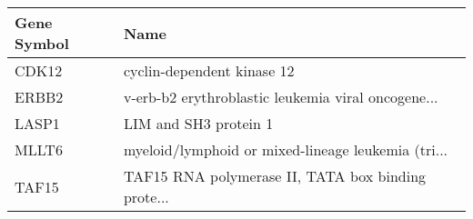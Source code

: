 \begin{tabular}{ll}
\toprule
Gene Symbol &                                               Name \\
\midrule
      CDK12 &                         cyclin-dependent kinase 12 \\
      ERBB2 & v-erb-b2 erythroblastic leukemia viral oncogene... \\
      LASP1 &                              LIM and SH3 protein 1 \\
      MLLT6 & myeloid/lymphoid or mixed-lineage leukemia (tri... \\
      TAF15 & TAF15 RNA polymerase II, TATA box binding prote... \\
\bottomrule
\end{tabular}
